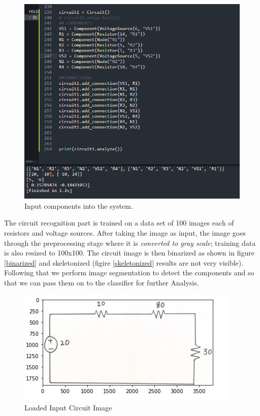\documentclass[conference]{IEEEtran}
\begin{document}
    \begin{figure}[h!]
        \centering
        \includegraphics[scale=0.4]{images/results.PNG}
        \caption{Input components into the system.}
        \label{fig:sols_results}
    \end{figure}
    
    The circuit recognition part is trained on a data set of 100 images each of resistors and voltage sources. After taking the image as input, the image goes through the preprocessing stage where it is \textit{converted to gray scale}; training data is also resized to 100x100. The circuit image is then binarized as shown in figure \ref{binarized} and skeletonized (figire \ref{skeletonized} results are not very visible). Following that we perform image segmentation to detect the components and so that we can pass them on to the classifier for further Analysis. 
    
    \begin{figure}[h!]
        \centering
        \includegraphics{images/loaded_img.PNG}
        \caption{Loaded Input Circuit Image}
        \label{fig:loaded_img}
    \end{figure}
\end{document}
